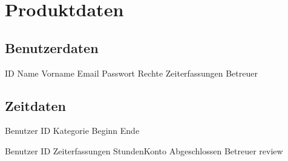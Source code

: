 \section{Produktdaten}

\subsection{Benutzerdaten}
\begin{requirements}
    \begin{requirements}
         ID
         Name
         Vorname
         Email
         Passwort
         Rechte
         Zeiterfassungen
         Betreuer
    \end{requirements}
\end{requirements}

\subsection{Zeitdaten}
\begin{requirements}
    \begin{requirements}
         Benutzer ID
         Kategorie
         Beginn
         Ende
    \end{requirements}

    \begin{requirements}
             Benutzer ID
             Zeiterfassungen
             StundenKonto
             Abgeschlossen
             Betreuer review
    \end{requirements}
\end{requirements}


